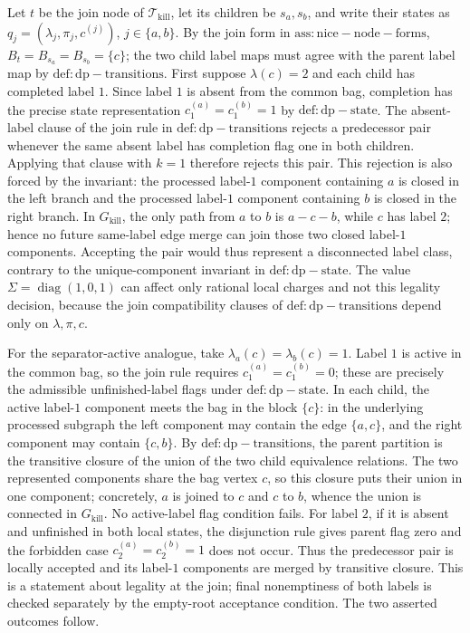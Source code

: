 Let \(t\) be the join node of \(\mathcal T_{\mathrm{kill}}\), let its children be \(s_a,s_b\), and write their states as \(q_j=(\lambda_j,\pi_j,c^{(j)})\), \(j\in\{a,b\}\). By the join form in \(\mathrm{ass:nice-node-forms}\), \(B_t=B_{s_a}=B_{s_b}=\{c\}\); the two child label maps must agree with the parent label map by \(\mathrm{def:dp-transitions}\). First suppose \(\lambda(c)=2\) and each child has completed label \(1\). Since label \(1\) is absent from the common bag, completion has the precise state representation \(c^{(a)}_1=c^{(b)}_1=1\) by \(\mathrm{def:dp-state}\). The absent-label clause of the join rule in \(\mathrm{def:dp-transitions}\) rejects a predecessor pair whenever the same absent label has completion flag one in both children. Applying that clause with \(k=1\) therefore rejects this pair. This rejection is also forced by the invariant: the processed label-\(1\) component containing \(a\) is closed in the left branch and the processed label-\(1\) component containing \(b\) is closed in the right branch. In \(G_{\mathrm{kill}}\), the only path from \(a\) to \(b\) is \(a-c-b\), while \(c\) has label \(2\); hence no future same-label edge merge can join those two closed label-\(1\) components. Accepting the pair would thus represent a disconnected label class, contrary to the unique-component invariant in \(\mathrm{def:dp-state}\). The value \(\Sigma=\operatorname{diag}(1,0,1)\) can affect only rational local charges and not this legality decision, because the join compatibility clauses of \(\mathrm{def:dp-transitions}\) depend only on \(\lambda,\pi,c\).

For the separator-active analogue, take \(\lambda_a(c)=\lambda_b(c)=1\). Label \(1\) is active in the common bag, so the join rule requires \(c^{(a)}_1=c^{(b)}_1=0\); these are precisely the admissible unfinished-label flags under \(\mathrm{def:dp-state}\). In each child, the active label-\(1\) component meets the bag in the block \(\{c\}\): in the underlying processed subgraph the left component may contain the edge \(\{a,c\}\), and the right component may contain \(\{c,b\}\). By \(\mathrm{def:dp-transitions}\), the parent partition is the transitive closure of the union of the two child equivalence relations. The two represented components share the bag vertex \(c\), so this closure puts their union in one component; concretely, \(a\) is joined to \(c\) and \(c\) to \(b\), whence the union is connected in \(G_{\mathrm{kill}}\). No active-label flag condition fails. For label \(2\), if it is absent and unfinished in both local states, the disjunction rule gives parent flag zero and the forbidden case \(c^{(a)}_2=c^{(b)}_2=1\) does not occur. Thus the predecessor pair is locally accepted and its label-\(1\) components are merged by transitive closure. This is a statement about legality at the join; final nonemptiness of both labels is checked separately by the empty-root acceptance condition. The two asserted outcomes follow.
